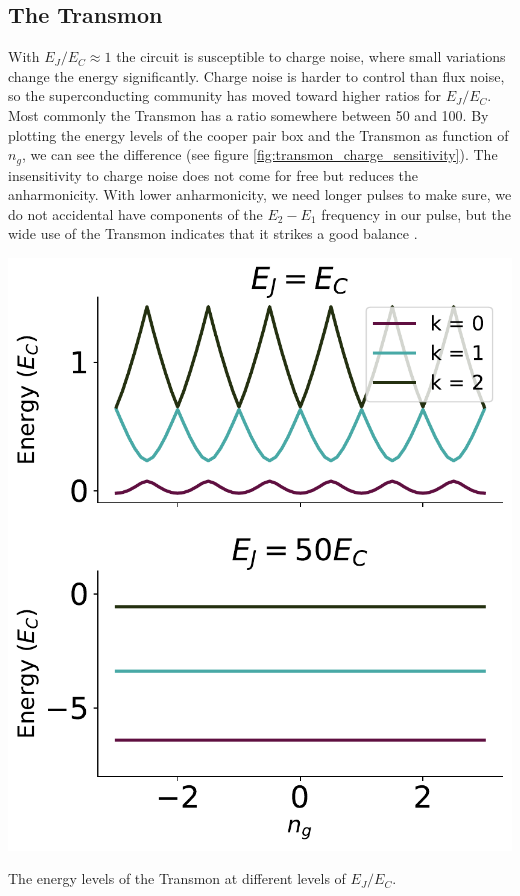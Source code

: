 \subsection{The Transmon}
With $E_J / E_C \approx 1$ the circuit is susceptible to charge noise, where small variations change the energy significantly. Charge noise is harder to control than flux noise, so the superconducting community has moved toward higher ratios for $E_J / E_C$. Most commonly the Transmon has a ratio somewhere between 50 and 100. By plotting the energy levels of the cooper pair box and the Transmon as function of $n_g$, we can see the difference (see figure \ref{fig:transmon_charge_sensitivity}). The insensitivity to charge noise does not come for free but reduces the anharmonicity. With lower anharmonicity, we need longer pulses to make sure, we do not accidental have components of the $E_2 - E_1$ frequency in our pulse, but the wide use of the Transmon indicates that it strikes a good balance \cite{koch_charge_2007}. 
\begin{marginfigure}
    \centering
    \includegraphics[width = 1.00 \linewidth]{Figs/Theory/Transmon_energy_vs_ng.pdf}
    \caption{The energy levels of the Transmon at different levels of $E_J / E_C$.}
    \label{fig:transmon_charge_sensitivity}
\end{marginfigure}

